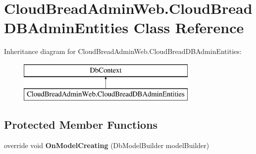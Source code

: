 \hypertarget{class_cloud_bread_admin_web_1_1_cloud_bread_d_b_admin_entities}{}\section{Cloud\+Bread\+Admin\+Web.\+Cloud\+Bread\+D\+B\+Admin\+Entities Class Reference}
\label{class_cloud_bread_admin_web_1_1_cloud_bread_d_b_admin_entities}
Inheritance diagram for Cloud\+Bread\+Admin\+Web.\+Cloud\+Bread\+D\+B\+Admin\+Entities\+:\begin{figure}[H]
\begin{center}
\leavevmode
\includegraphics[height=2.000000cm]{class_cloud_bread_admin_web_1_1_cloud_bread_d_b_admin_entities}
\end{center}
\end{figure}
\subsection*{Protected Member Functions}
\begin{DoxyCompactItemize}
\item 
override void {\bfseries On\+Model\+Creating} (Db\+Model\+Builder model\+Builder)\hypertarget{class_cloud_bread_admin_web_1_1_cloud_bread_d_b_admin_entities_a5ccd5188cb9e1f2e6d2b679507002edb}{}\label{class_cloud_bread_admin_web_1_1_cloud_bread_d_b_admin_entities_a5ccd5188cb9e1f2e6d2b679507002edb}

\end{DoxyCompactItemize}
